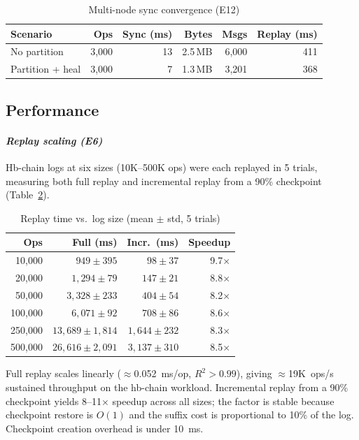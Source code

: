 \documentclass[10pt,journal,compsoc]{IEEEtran}
\begin{document}
\begin{table}[!htbp]
\centering
\caption{Multi-node sync convergence (E12)}
\label{tab:e12-sync}
\begin{tabular}{@{}lrrrrr@{}}
\toprule
\textbf{Scenario} & \textbf{Ops} & \textbf{Sync (ms)} & \textbf{Bytes} & \textbf{Msgs} & \textbf{Replay (ms)} \\
\midrule
No partition     & 3,000 & 13  & 2.5\,MB & 6,000 & 411 \\
Partition + heal & 3,000 & 7   & 1.3\,MB & 3,201 & 368 \\
\bottomrule
\end{tabular}
\end{table}


\subsection{Performance}\label{subsec:performance}

\paragraph*{\textbf{\textit{Replay scaling (E6)}}}
Hb-chain logs at six sizes (10K--500K ops) were each replayed in 5 trials, measuring both full replay and incremental replay from a 90\% checkpoint (Table~\ref{tab:e6-replay}).

\begin{table}[!htbp]
\centering
\caption{Replay time vs.\ log size (mean $\pm$ std, 5 trials)}
\label{tab:e6-replay}
\begin{tabular}{@{}rrrr@{}}
\toprule
\textbf{Ops} & \textbf{Full (ms)} & \textbf{Incr.\ (ms)} & \textbf{Speedup} \\
\midrule
10,000  & $949 \pm 395$   & $98 \pm 37$     & 9.7$\times$ \\
20,000  & $1{,}294 \pm 79$  & $147 \pm 21$    & 8.8$\times$ \\
50,000  & $3{,}328 \pm 233$ & $404 \pm 54$    & 8.2$\times$ \\
100,000 & $6{,}071 \pm 92$  & $708 \pm 86$    & 8.6$\times$ \\
250,000 & $13{,}689 \pm 1{,}814$ & $1{,}644 \pm 232$ & 8.3$\times$ \\
500,000 & $26{,}616 \pm 2{,}091$ & $3{,}137 \pm 310$ & 8.5$\times$ \\
\bottomrule
\end{tabular}
\end{table}

Full replay scales linearly ($\approx$0.052~ms/op, $R^2>0.99$), giving $\approx$19K~ops/s sustained throughput on the hb-chain workload. Incremental replay from a 90\% checkpoint yields 8--11$\times$ speedup across all sizes; the factor is stable because checkpoint restore is $O(1)$ and the suffix cost is proportional to 10\% of the log. Checkpoint creation overhead is under 10~ms.
\end{document}
